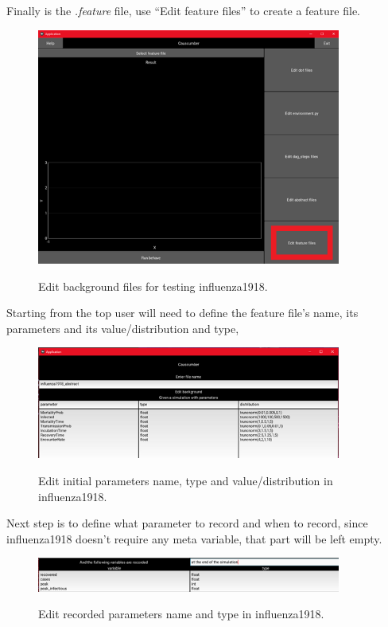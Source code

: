 Finally is the \textsl{.feature} file, use “Edit feature files” to create a feature file. 
\begin{figure}[H]
	\centering
	\includegraphics[width=10cm]{figures/influenzaTestProcess9.png}\\
	\caption{Edit background files for testing influenza1918.}
	\label{fig:figure27}
\end{figure}
Starting from the top user will need to define the feature file’s name, its parameters and its value/distribution and type,
\begin{figure}[H]
	\centering
	\includegraphics[width=10cm]{figures/influenzaTestProcess10.png}\\
	\caption{Edit initial parameters name, type and value/distribution in influenza1918.}
	\label{fig:figure28}
\end{figure}
Next step is to define what parameter to record and when to record, since influenza1918 doesn’t require any meta variable, that part will be left empty.
\begin{figure}[H]
	\centering
	\includegraphics[width=10cm]{figures/influenzaTestProcess11.png}\\
	\caption{Edit recorded parameters name and type in influenza1918.}
	\label{fig:figure29}
\end{figure}
